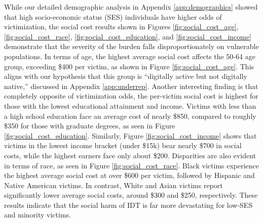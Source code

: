 While our detailed demographic analysis in Appendix \ref{app:demographics} showed that high socio-economic status (SES) individuals have higher odds of victimization, the social cost results shown in Figures \ref{fig:social_cost_age}, \ref{fig:social_cost_race}, \ref{fig:social_cost_education}, and \ref{fig:social_cost_income} demonstrate that the severity of the burden falls disproportionately on vulnerable populations. In terms of age, the highest average social cost affects the 50-64 age group, exceeding \$400 per victim, as shown in Figure \ref{fig:social_cost_age}. This aligns with our hypothesis that this group is ``digitally active but not digitally native,'' discussed in Appendix \ref{app:underrep}. Another interesting finding is that completely opposite of victimization odds, the per-victim social cost is highest for those with the lowest educational attainment and income. Victims with less than a high school education face an average cost of nearly \$850, compared to roughly \$350 for those with graduate degrees, as seen in Figure \ref{fig:social_cost_education}. Similarly, Figure \ref{fig:social_cost_income} shows that victims in the lowest income bracket (under \$15k) bear nearly \$700 in social costs, while the highest earners face only about \$200. Disparities are also evident in terms of race, as seen in Figure \ref{fig:social_cost_race}. Black victims experience the highest average social cost at over \$600 per victim, followed by Hispanic and Native American victims. In contrast, White and Asian victims report significantly lower average social costs, around \$300 and \$250, respectively. These results indicate that the social harm of IDT is far more devastating for low-SES and minority victims.


